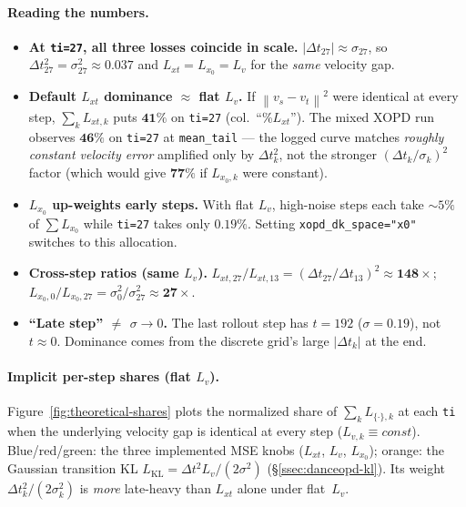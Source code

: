 \documentclass[11pt,a4paper]{article}
\newcommand{\norm}[1]{\left\lVert #1 \right\rVert}
\newcommand{\dt}{\Delta t}
\begin{document}
\paragraph{Reading the numbers.}
\begin{itemize}[leftmargin=1.5em]
\item \textbf{At \texttt{ti=27}, all three losses coincide in scale.} $\lvert\dt_{27}\rvert\approx
\sigma_{27}$, so $\dt_{27}^2=\sigma_{27}^2\approx0.037$ and $L_{xt}=L_{x_0}=L_v$ for the \emph{same}
velocity gap.
\item \textbf{Default $L_{xt}$ dominance $\approx$ flat $L_v$.} If $\norm{v_s-v_t}^2$ were identical
at every step, $\sum_k L_{xt,k}$ puts $\mathbf{41\%}$ on \texttt{ti=27} (col.~``\%$L_{xt}$'').
The mixed XOPD run observes $\mathbf{46\%}$ on \texttt{ti=27} at \texttt{mean\_tail} --- the logged curve matches
\emph{roughly constant velocity error} amplified only by $\dt_k^2$, not the stronger
$(\dt_k/\sigma_k)^2$ factor (which would give $\mathbf{77\%}$ if $L_{x_0,k}$ were constant).
\item \textbf{$L_{x_0}$ up-weights early steps.} With flat $L_v$, high-noise steps each take
$\sim5\%$ of $\sum L_{x_0}$ while \texttt{ti=27} takes only $\mathbf{0.19\%}$. Setting
\texttt{xopd\_dk\_space="x0"} switches to this allocation.
\item \textbf{Cross-step ratios (same $L_v$).} $L_{xt,27}/L_{xt,13}=(\dt_{27}/\dt_{13})^2
\approx\mathbf{148\times}$; $L_{x_0,0}/L_{x_0,27}=\sigma_0^2/\sigma_{27}^2\approx\mathbf{27\times}$.
\item \textbf{``Late step'' $\neq$ $\sigma\to0$.} The last rollout step has $t=192$ ($\sigma=0.19$),
not $t\approx0$. Dominance comes from the discrete grid's large $\lvert\dt_k\rvert$ at the end.
\end{itemize}

\paragraph{Implicit per-step shares (flat $L_v$).}
Figure~\ref{fig:theoretical-shares} plots the normalized share of $\sum_k L_{\{\cdot\},k}$ at each
\texttt{ti} when the underlying velocity gap is identical at every step
($L_{v,k}\equiv const$). Blue/red/green: the three implemented MSE knobs ($L_{xt}$, $L_v$,
$L_{x_0}$); orange: the Gaussian transition KL $L_{\mathrm{KL}}=\dt^2 L_v/(2\sigma^2)$
(\S\ref{ssec:danceopd-kl}). Its weight $\dt_k^2/(2\sigma_k^2)$ is \emph{more} late-heavy than
$L_{xt}$ alone under flat~$L_v$.
\end{document}
